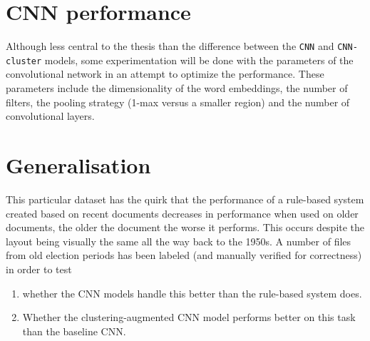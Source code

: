 \section{CNN performance}
Although less central to the thesis than the difference between the \texttt{CNN}
and \texttt{CNN-cluster} models, some experimentation will be done with the
parameters of the convolutional network in an attempt to optimize the
performance. These parameters include the dimensionality of the word embeddings,
the number of filters, the pooling strategy (1-max versus a smaller region) and
the number of convolutional layers.

\section{Generalisation}
This particular dataset has the quirk that the performance of a rule-based
system created based on recent documents decreases in performance when used on
older documents, the older the document the worse it performs. This occurs
despite the layout being visually the same all the way back to the 1950s. A
number of files from old election periods has been labeled (and manually
verified for correctness) in order to test
\begin{enumerate}
\item whether the CNN models handle this better than the rule-based system does.
\item Whether the clustering-augmented CNN model performs better on this task
  than the baseline CNN.
\end{enumerate}

